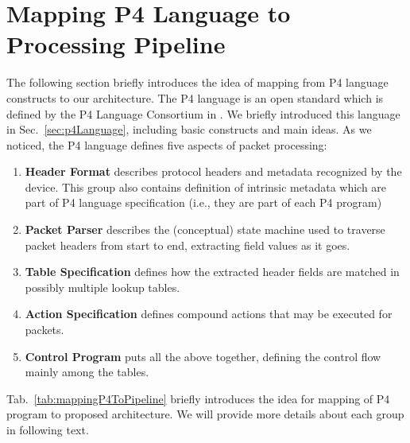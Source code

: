 \section{Mapping P4 Language to Processing Pipeline} 
\label{sec:mappingP4ToProcessingPipeline}
The following section briefly introduces the idea of mapping from P4 language constructs to our architecture. 
The P4 language is an open standard which is defined by the P4 Language Consortium in \cite{p4languagespec}. 
We briefly introduced this language in Sec.~\ref{sec:p4Language}, including basic constructs and main ideas.
As we noticed, the P4 language defines five aspects of packet processing:
\begin{enumerate}
\item \textbf{Header Format} describes protocol headers and metadata recognized by the device. 
This group also contains definition of intrinsic metadata which are part of P4 language specification (i.e., they are part of each P4 program)
\item \textbf{Packet Parser} describes the (conceptual) state machine used to traverse packet headers from 
start to end, extracting field values as it goes.
\item \textbf{Table Specification} defines how the extracted header fields are matched in possibly multiple 
lookup tables.
\item \textbf{Action Specification} defines compound actions that may be executed for packets.
\item \textbf{Control Program} puts all the above together, defining the control flow mainly among the tables.
\end{enumerate}

Tab.~\ref{tab:mappingP4ToPipeline} briefly introduces the idea for mapping of P4 program to proposed architecture. 
We will provide more details about each group in following text.

